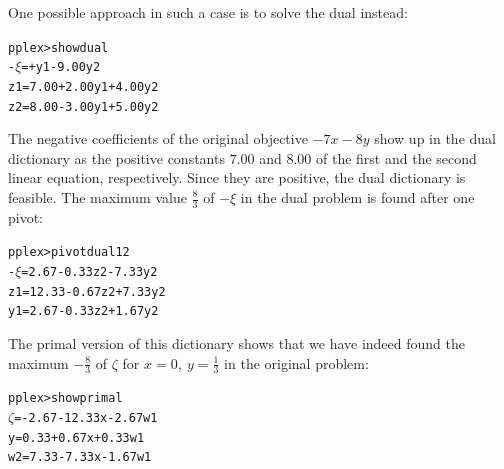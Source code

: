 \documentclass[ukenglish]{nik}
\begin{document}
One possible approach in such a case is to solve the dual instead:
\begin{alltt}
pplex> show dual
-\(\xi\) =      +     y1 - 9.00y2
z1 = 7.00 + 2.00y1 + 4.00y2
z2 = 8.00 - 3.00y1 + 5.00y2
\end{alltt}
The negative coefficients of the original objective $-7x-8y$ show up in the dual
dictionary as the positive constants $7.00$ and $8.00$ of the first and the second 
linear equation, respectively. Since they are positive, the dual dictionary is feasible.
The maximum value $\frac{8}{3}$ of \(-\xi\) in the dual problem is found after one pivot:
\begin{alltt}
pplex> pivot dual 1 2
-\(\xi\) =  2.67 - 0.33z2 - 7.33y2
z1 = 12.33 - 0.67z2 + 7.33y2
y1 =  2.67 - 0.33z2 + 1.67y2
\end{alltt}
The primal version of this dictionary shows that we have indeed found the
maximum $-\frac{8}{3}$ of $\zeta$ for $x=0,~y=\frac{1}{3}$ in the original problem:
\begin{alltt}
pplex> show primal
 \(\zeta\) = - 2.67 - 12.33x - 2.67w1
 y =   0.33 +  0.67x + 0.33w1
w2 =   7.33 -  7.33x - 1.67w1
\end{alltt}
\end{document}
